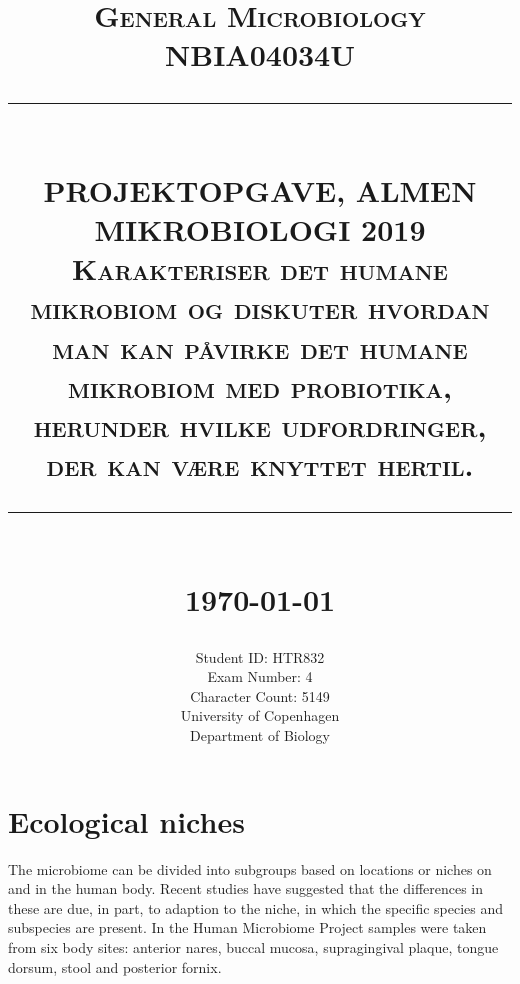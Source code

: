 \documentclass[12pt]{article}
\newcommand{\HRule}[1]{\rule{\linewidth}{#1}}
\begin{document}
% 
\title{ \normalsize \textsc{General Microbiology\\
NBIA04034U}
		\\ [2.0cm]
		\HRule{0.5pt} \\
		\LARGE \textbf{\uppercase{Projektopgave, Almen Mikrobiologi 2019}\\
		\normalsize{\textsc{Karakteriser det humane mikrobiom og diskuter hvordan man kan påvirke det humane mikrobiom med probiotika, herunder hvilke udfordringer, der kan være knyttet hertil.}}}
		\HRule{2pt} \\ [0.5cm]
		\normalsize \today \vspace*{5\baselineskip}}

\date{}

\author{
		Student ID: HTR832 \\ 
		Exam Number: 4\\
		Character Count: 5149\\
		University of Copenhagen \\
		Department of Biology}

\maketitle
\newpage

\tableofcontents
\newpage

\sectionfont{\scshape}



\section{Ecological niches}
The microbiome can be divided into subgroups based on locations or niches on and in the human body. Recent studies have suggested that the differences in these are due, in part, to adaption to the niche, in which the specific species and subspecies are present\cite{Lloyd-Price2017}. In the Human Microbiome Project samples were taken from six body sites: anterior nares, buccal mucosa, supragingival plaque, tongue dorsum, stool and posterior fornix\cite{Lloyd-Price2017}.  
\end{document}

